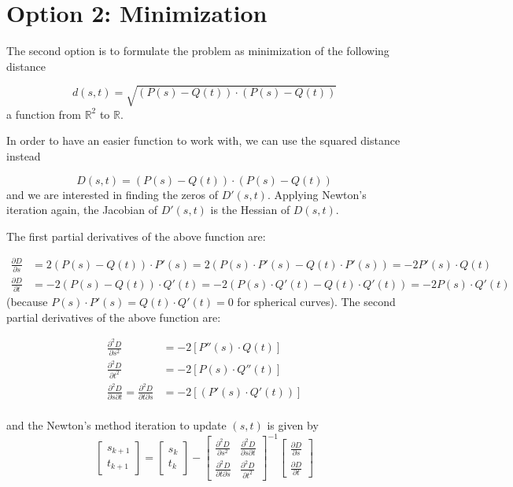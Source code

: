 \documentclass[11pt]{article}
\begin{document}
\clearpage
\section*{Option 2: Minimization}
The second option is to formulate the problem as minimization of the following distance

$$d(s,t) = \sqrt{(P(s) - Q(t)) \cdot (P(s)-Q(t))}$$
a function from $\mathbb{R}^2$ to $\mathbb{R}$.

In order to have an easier function to work with, we can use the squared distance instead

$$D(s,t) = (P(s) - Q(t)) \cdot (P(s)-Q(t))$$
and we are interested in finding the zeros of $D'(s,t)$. Applying Newton's iteration again,
the Jacobian of $D'(s,t)$ is the Hessian of $D(s,t)$.

The first partial derivatives of the above function are:

\begin{align*}
  \frac{\partial D}{\partial s} & = 2(P(s) - Q(t)) \cdot P'(s) = 2(P(s) \cdot P'(s) - Q(t) \cdot P'(s)) = -2 P'(s) \cdot Q(t) \\
  \frac{\partial D}{\partial t} & = -2(P(s) - Q(t)) \cdot Q'(t) = -2(P(s)\cdot Q'(t) - Q(t)\cdot Q'(t)) = -2 P(s) \cdot Q'(t)
\end{align*}
(because $P(s)\cdot P'(s) = Q(t) \cdot Q'(t) = 0$ for spherical curves). The second partial derivatives of the above function are:

\begin{align*}
  \frac{\partial^2 D}{\partial s^2}          & = -2\left[P''(s) \cdot Q(t)\right]     \\
  \frac{\partial^2 D}{\partial t^2}          & = -2\left[P(s)  \cdot Q''(t)\right]    \\
  \frac{\partial^2 D}{\partial s \partial t} =
  \frac{\partial^2 D}{\partial t \partial s} & = -2\left[(P'(s)  \cdot  Q'(t))\right] \\
\end{align*}

and the Newton's method iteration to update $(s,t)$ is given by
$$
  \begin{bmatrix}
    s_{k+1} \\t_{k+1}
  \end{bmatrix}
  =
  \begin{bmatrix}
    s_{k} \\t_{k}
  \end{bmatrix}
  -
  \begin{bmatrix}
    \frac{\partial^2 D}{\partial s^2}          & \frac{\partial^2 D}{\partial s \partial t} \\
    \frac{\partial^2 D}{\partial t \partial s} & \frac{\partial^2 D}{\partial t^2}
  \end{bmatrix}^{-1}
  \begin{bmatrix}
    \frac{\partial D}{\partial s} \\
    \frac{\partial D}{\partial t}
  \end{bmatrix}
$$
\end{document}

